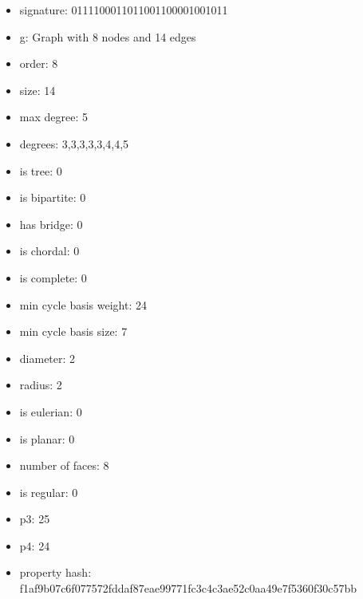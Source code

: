 \begin{itemize}
\item signature: 0111100011011001100001001011
\item g: Graph with 8 nodes and 14 edges
\item order: 8
\item size: 14
\item max degree: 5
\item degrees: 3,3,3,3,3,4,4,5
\item is tree: 0
\item is bipartite: 0
\item has bridge: 0
\item is chordal: 0
\item is complete: 0
\item min cycle basis weight: 24
\item min cycle basis size: 7
\item diameter: 2
\item radius: 2
\item is eulerian: 0
\item is planar: 0
\item number of faces: 8
\item is regular: 0
\item p3: 25
\item p4: 24
\item property hash: f1af9b07c6f077572fddaf87eae99771fc3c4c3ae52c0aa49e7f5360f30c57bb
\end{itemize}
\newpage
\begin{figure}
\end{figure}
